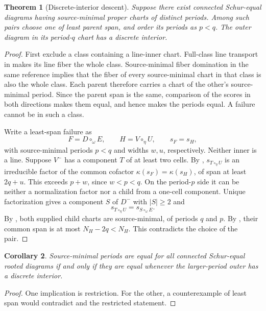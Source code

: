 \documentclass[11pt,a4paper]{amsart}
\numberwithin{equation}{section}
\theoremstyle{plain}
\newtheorem{theorem}{Theorem}[section]
\newtheorem{corollary}[theorem]{Corollary}
\theoremstyle{definition}
\begin{document}
\begin{theorem}[Discrete-interior descent]\label{thm:descent}
Suppose there exist connected Schur-equal diagrams having source-minimal proper charts of distinct periods.  Among such pairs choose one of least parent span, and order its periods as \(p<q\).  The outer diagram in its period-\(q\) chart has a discrete interior.
\end{theorem}
\begin{proof}
First exclude a class containing a line-inner chart.  Full-class line transport in \cite{Shields2026Gluing} makes its line fiber the whole class.  Source-minimal fiber domination in the same reference implies that the fiber of every source-minimal chart in that class is also the whole class.  Each parent therefore carries a chart of the other's source-minimal period.  Since the parent span is the same, comparison of the scores in both directions makes them equal, and hence makes the periods equal.  A failure cannot be in such a class.

Write a least-span failure as
\begin{equation*}
 F=D\circ_\omega E,\qquad H=V\circ_\eta U,\qquad
 s_F=s_H,
\end{equation*}
with source-minimal periods \(p<q\) and widths \(w,u\), respectively.  Neither inner is a line.  Suppose \(V^-\) has a component \(T\) of at least two cells.  By ,
\(s_{T\circ_\eta U}\) is an irreducible factor of the common cofactor \(\kappa(s_F)=\kappa(s_H)\), of span at least \(2q+u\).  This exceeds \(p+w\), since \(w<p<q\).  On the period-\(p\) side it can be neither a normalization factor nor a child from a one-cell component.  Unique factorization gives a component \(S\) of \(D^-\) with \(|S|\ge2\) and
\begin{equation*}
 s_{T\circ_\eta U}=s_{S\circ_\omega E}.
\end{equation*}
By , both supplied child charts are source-minimal, of periods \(q\) and \(p\).  By , their common span is at most \(N_H-2q<N_H\).  This contradicts the choice of the pair.
\end{proof}

\begin{corollary}\label{cor:equivalent-base}
Source-minimal periods are equal for all connected Schur-equal rooted diagrams if and only if they are equal whenever the larger-period outer has a discrete interior.
\end{corollary}
\begin{proof}
One implication is restriction.  For the other, a counterexample of least span would contradict  and the restricted statement.
\end{proof}
\end{document}
